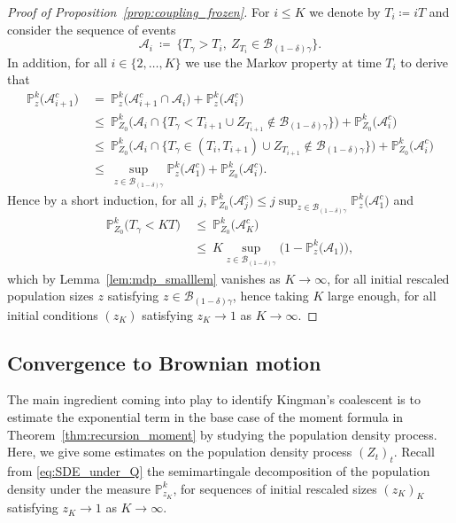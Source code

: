 \begin{refsegment}
\begin{proof}[Proof of Proposition~\ref{prop:coupling_frozen}]
For $i\leqslant K$ we denote by $T_i\coloneqq iT$ and consider the sequence of events
\begin{equation*}
    \mathcal{A}_i\ \coloneqq\ \big\{ T_{\gamma} > T_i,\ Z_{T_i} \in \mathscr{B}_{(1-\delta)\gamma}\big\}.
\end{equation*}
In addition, for all $i\in \{2,\ldots,K \}$ we use the Markov property at time $T_i$ to derive that
\begin{align*}
    \mathbb{P}^k_{z}\big(\mathcal{A}_{i+1}^c\big)\ &=\ \mathbb{P}^k_{z}\big(\mathcal{A}_{i+1}^c\cap \mathcal{A}_{i}\big)+\mathbb{P}^k_{z}\big(\mathcal{A}_{i}^c\big)\\
    &\leqslant\ \mathbb{P}^k_{Z_{0}}\big(\mathcal{A}_{i} \cap \{T_{\gamma}<T_{i+1} \cup {Z}_{T_{i+1}}\not\in \mathscr{B}_{(1-\delta)\gamma} \}\big)  +  \mathbb{P}^k_{Z_{0}}\big(\mathcal{A}_{i}^c\big) \\
    &\leqslant\ \mathbb{P}^k_{Z_{0}}\big(\mathcal{A}_{i} \cap \{T_{\gamma}\in (T_i, T_{i+1}) \cup {Z}_{T_{i+1}}\not\in \mathscr{B}_{(1-\delta)\gamma} \}\big)  +  \mathbb{P}^k_{Z_{0}}\big(\mathcal{A}_{i}^c\big) \\
    &\leqslant\ \sup_{z \in \mathscr{B}_{(1-\delta)\gamma}} \mathbb{P}^k_{z}\big(\mathcal{A}_{1}^c\big) +  \mathbb{P}^k_{Z_{0}}\big(\mathcal{A}_{i}^c\big) .
\end{align*}
Hence by a short induction, for all $j$,
$\mathbb{P}^k_{Z_{0}}\big(\mathcal{A}^c_j\big)\leqslant  j\sup_{z \in \mathscr{B}_{(1-\delta)\gamma}}\mathbb{P}^k_{z}\big(\mathcal{A}^c_1\big)$ and 
\begin{align*}
    \mathbb{P}^k_{Z_{0}}\big( T_{\gamma} < KT \big)
    \ &\leqslant\
    \mathbb{P}^k_{Z_{0}}\big( \mathcal{A}^c_K \big) 
    \\
    &\leqslant\ K\sup_{z \in \mathscr{B}_{(1-\delta)\gamma}}\big(1- \mathbb{P}^k_{z}\big(\mathcal{A}_1\big)\big),
\end{align*}
which by Lemma~\ref{lem:mdp_smalllem} vanishes as $K\to\infty$, for all initial rescaled population sizes $z$ satisfying $z\in \mathscr{B}_{(1-\delta)\gamma}$, hence taking $K$ large enough, for all initial conditions $(z_K)$ satisfying $z_K\to 1$ as $K\to\infty$.
\end{proof}


\subsection{Convergence to Brownian motion}\label{sec:densityprocess}
The main ingredient coming into play to identify Kingman's coalescent is
to estimate the exponential term in the base case of the moment formula
in Theorem~\ref{thm:recursion_moment} by studying the population density
process. Here, we give some estimates on the population density process
$(Z_t)_t$. Recall from \eqref{eq:SDE_under_Q} the semimartingale
decomposition of the population density under the measure $\mathbb{P}^k_{z_K}$, for sequences of initial rescaled sizes $(z_K)_K$ satisfying $z_K\to 1$ as $K\to \infty$. 



\end{refsegment}
